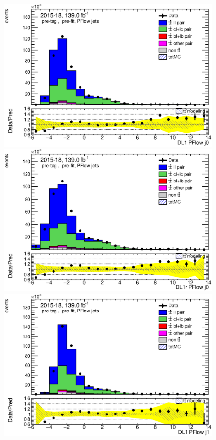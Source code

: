\documentclass[letterpaper,12pt]{article}
\begin{document}
\begin{figure}[H]
	\begin{minipage}[b]{.45\textwidth}
	\centering
	\includegraphics[width=1\textwidth]{Oct_distributions/pretagNoRwDL1rwithhighpTPFlow_scaledall/DataMC__J0_DL1.eps}
	\end{minipage}\hfill
	\begin{minipage}[b]{.45\textwidth}
	\centering
	\includegraphics[width=1\textwidth]{Oct_distributions/pretagNoRwDL1rwithhighpTPFlow_scaledall/DataMC__J0_DL1r.eps}
	\end{minipage}\hfill
	\begin{minipage}[b]{.45\textwidth}
	\centering
	\includegraphics[width=1\textwidth]{Oct_distributions/pretagNoRwDL1rwithhighpTPFlow_scaledall/DataMC__J1_DL1.eps}

\end{minipage}
\end{figure}
\end{document}
